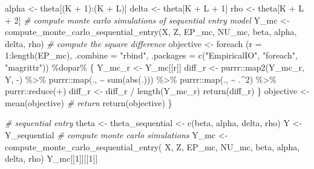 \documentclass[
]{article}
\newenvironment{Shaded}{\begin{snugshade}}{\end{snugshade}}
\newcommand{\AttributeTok}[1]{\textcolor[rgb]{0.77,0.63,0.00}{#1}}
\newcommand{\CommentTok}[1]{\textcolor[rgb]{0.56,0.35,0.01}{\textit{#1}}}
\newcommand{\DecValTok}[1]{\textcolor[rgb]{0.00,0.00,0.81}{#1}}
\newcommand{\FunctionTok}[1]{\textcolor[rgb]{0.00,0.00,0.00}{#1}}
\newcommand{\NormalTok}[1]{#1}
\newcommand{\OtherTok}[1]{\textcolor[rgb]{0.56,0.35,0.01}{#1}}
\newcommand{\SpecialCharTok}[1]{\textcolor[rgb]{0.00,0.00,0.00}{#1}}
\newcommand{\StringTok}[1]{\textcolor[rgb]{0.31,0.60,0.02}{#1}}
\begin{document}
\begin{Shaded}
\begin{Highlighting}[]
\NormalTok{    alpha }\OtherTok{\textless{}{-}}\NormalTok{ theta[(K }\SpecialCharTok{+} \DecValTok{1}\NormalTok{)}\SpecialCharTok{:}\NormalTok{(K }\SpecialCharTok{+}\NormalTok{ L)]}
\NormalTok{    delta }\OtherTok{\textless{}{-}}\NormalTok{ theta[K }\SpecialCharTok{+}\NormalTok{ L }\SpecialCharTok{+} \DecValTok{1}\NormalTok{]}
\NormalTok{    rho }\OtherTok{\textless{}{-}}\NormalTok{ theta[K }\SpecialCharTok{+}\NormalTok{ L }\SpecialCharTok{+} \DecValTok{2}\NormalTok{]}
    \CommentTok{\# compute monte carlo simulations of sequential entry model}
\NormalTok{    Y\_mc }\OtherTok{\textless{}{-}} \FunctionTok{compute\_monte\_carlo\_sequential\_entry}\NormalTok{(X, Z, EP\_mc, NU\_mc,}
\NormalTok{                                                 beta, alpha, delta, rho)}
    \CommentTok{\# compute the square difference}
\NormalTok{    objective }\OtherTok{\textless{}{-}}
      \FunctionTok{foreach}\NormalTok{ (}\AttributeTok{r =} \DecValTok{1}\SpecialCharTok{:}\FunctionTok{length}\NormalTok{(EP\_mc), }\AttributeTok{.combine =} \StringTok{"rbind"}\NormalTok{, }\AttributeTok{.packages =} \FunctionTok{c}\NormalTok{(}\StringTok{"EmpiricalIO"}\NormalTok{, }\StringTok{"foreach"}\NormalTok{, }\StringTok{"magrittr"}\NormalTok{)) }\SpecialCharTok{\%dopar\%}\NormalTok{ \{}
\NormalTok{        Y\_mc\_r }\OtherTok{\textless{}{-}}\NormalTok{ Y\_mc[[r]]}
\NormalTok{        diff\_r }\OtherTok{\textless{}{-}}\NormalTok{ purrr}\SpecialCharTok{::}\FunctionTok{map2}\NormalTok{(Y\_mc\_r, Y, }\StringTok{\textasciigrave{}}\AttributeTok{{-}}\StringTok{\textasciigrave{}}\NormalTok{) }\SpecialCharTok{\%\textgreater{}\%}
\NormalTok{          purrr}\SpecialCharTok{::}\FunctionTok{map}\NormalTok{(., }\SpecialCharTok{\textasciitilde{}} \FunctionTok{sum}\NormalTok{(}\FunctionTok{abs}\NormalTok{(.))) }\SpecialCharTok{\%\textgreater{}\%}
\NormalTok{          purrr}\SpecialCharTok{::}\FunctionTok{map}\NormalTok{(., }\SpecialCharTok{\textasciitilde{}}\NormalTok{ .}\SpecialCharTok{\^{}}\DecValTok{2}\NormalTok{) }\SpecialCharTok{\%\textgreater{}\%}
\NormalTok{          purrr}\SpecialCharTok{::}\FunctionTok{reduce}\NormalTok{(}\StringTok{\textasciigrave{}}\AttributeTok{+}\StringTok{\textasciigrave{}}\NormalTok{)}
\NormalTok{        diff\_r }\OtherTok{\textless{}{-}}\NormalTok{ diff\_r }\SpecialCharTok{/} \FunctionTok{length}\NormalTok{(Y\_mc\_r)}
        \FunctionTok{return}\NormalTok{(diff\_r)}
\NormalTok{      \}}
\NormalTok{    objective }\OtherTok{\textless{}{-}} \FunctionTok{mean}\NormalTok{(objective)}
    \CommentTok{\# return}
    \FunctionTok{return}\NormalTok{(objective)}
\NormalTok{  \}}

\CommentTok{\# sequential entry}
\NormalTok{theta }\OtherTok{\textless{}{-}}\NormalTok{ theta\_sequential }\OtherTok{\textless{}{-}}
  \FunctionTok{c}\NormalTok{(beta, alpha, delta, rho)}
\NormalTok{Y }\OtherTok{\textless{}{-}}\NormalTok{ Y\_sequential}
\CommentTok{\# compute monte carlo simulations }
\NormalTok{Y\_mc }\OtherTok{\textless{}{-}} 
  \FunctionTok{compute\_monte\_carlo\_sequential\_entry}\NormalTok{(}
\NormalTok{    X, Z, EP\_mc, NU\_mc, beta, alpha, delta, rho)}
\NormalTok{Y\_mc[[}\DecValTok{1}\NormalTok{]][[}\DecValTok{1}\NormalTok{]]}
\end{Highlighting}
\end{Shaded}
\end{document}

